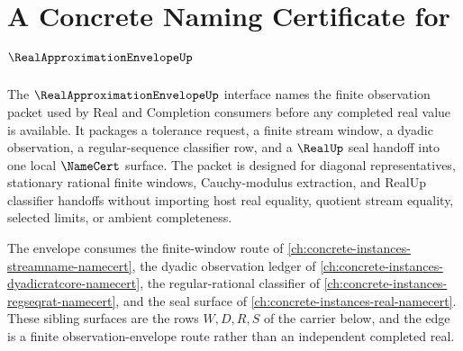 \chapter{A Concrete Naming Certificate for $\RealApproximationEnvelopeUp$}
\label{ch:concrete-instances-realapproximationenvelope-namecert}

The $\RealApproximationEnvelopeUp$ interface names the finite observation packet used by Real and Completion consumers before any completed real value is available. It packages a tolerance request, a finite stream window, a dyadic observation, a regular-sequence classifier row, and a $\RealUp$ seal handoff into one local $\NameCert$ surface. The packet is designed for diagonal representatives, stationary rational finite windows, Cauchy-modulus extraction, and RealUp classifier handoffs without importing host real equality, quotient stream equality, selected limits, or ambient completeness.

The envelope consumes the finite-window route of \autoref{ch:concrete-instances-streamname-namecert}, the dyadic observation ledger of \autoref{ch:concrete-instances-dyadicratcore-namecert}, the regular-rational classifier of \autoref{ch:concrete-instances-regseqrat-namecert}, and the seal surface of \autoref{ch:concrete-instances-real-namecert}. These sibling surfaces are the rows $W,D,R,S$ of the carrier below, and the edge is a finite observation-envelope route rather than an independent completed real.

